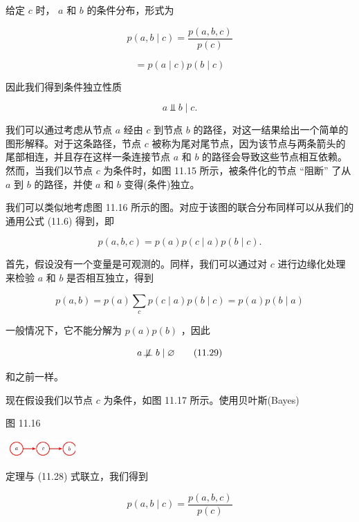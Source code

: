 \documentclass[10pt]{article}
\begin{document}
给定 \(c\) 时， \(a\) 和 \(b\) 的条件分布，形式为

\[
p\left( {a,b \mid  c}\right)  = \frac{p\left( {a,b,c}\right) }{p\left( c\right) }
\]

\[
= p\left( {a \mid  c}\right) p\left( {b \mid  c}\right)
\]

因此我们得到条件独立性质

\[
a ⫫ b \mid  c.
\]

我们可以通过考虑从节点 \(a\) 经由 \(c\) 到节点 \(b\) 的路径，对这一结果给出一个简单的图形解释。对于这条路径，节点 \(c\) 被称为尾对尾节点，因为该节点与两条箭头的尾部相连，并且存在这样一条连接节点 \(a\) 和 \(b\) 的路径会导致这些节点相互依赖。然而，当我们以节点 \(c\) 为条件时，如图 11.15 所示，被条件化的节点 “阻断” 了从 \(a\) 到 \(b\) 的路径，并使 \(a\) 和 \(b\) 变得(条件)独立。

我们可以类似地考虑图 11.16 所示的图。对应于该图的联合分布同样可以从我们的通用公式 (11.6) 得到，即

\[
p\left( {a,b,c}\right)  = p\left( a\right) p\left( {c \mid  a}\right) p\left( {b \mid  c}\right) . \tag{11.28}
\]

首先，假设没有一个变量是可观测的。同样，我们可以通过对 \(c\) 进行边缘化处理来检验 \(a\) 和 \(b\) 是否相互独立，得到

\[
p\left( {a,b}\right)  = p\left( a\right) \mathop{\sum }\limits_{c}p\left( {c \mid  a}\right) p\left( {b \mid  c}\right)  = p\left( a\right) p\left( {b \mid  a}\right)
\]

一般情况下，它不能分解为 \(p\left( a\right) p\left( b\right)\) ，因此

\[
a \mathrel{ \not \! \perp \!\!\! \perp } b \mid  \varnothing  \tag{11.29}
\]

和之前一样。

现在假设我们以节点 \(c\) 为条件，如图 11.17 所示。使用贝叶斯(Bayes)

图 11.16

\begin{center}
\includegraphics[max width=0.2\textwidth]{images/0194e279-9b28-703a-88f4-c3ac21e2010d_358_1198_1804_343_84_0.jpg}
\end{center}
\hspace*{3em} 

定理与 (11.28) 式联立，我们得到

\[
p\left( {a,b \mid  c}\right)  = \frac{p\left( {a,b,c}\right) }{p\left( c\right) }
\]
\end{document}
